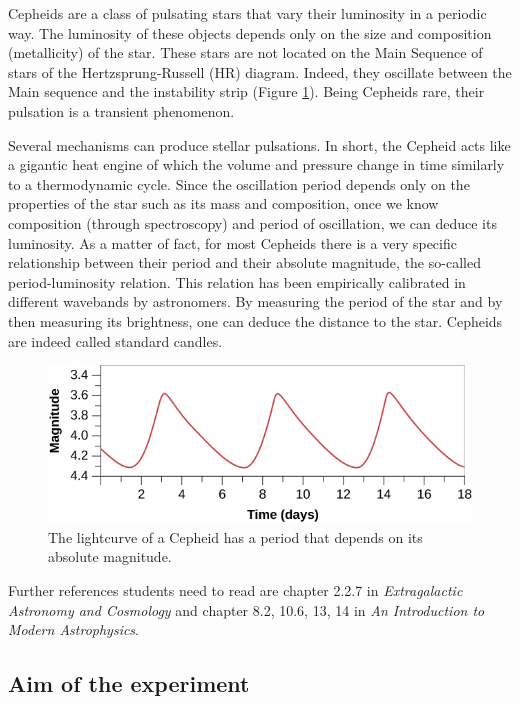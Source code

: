 \documentclass[a4paper, 11pt, fleqn]{memoir}
\begin{document}
Cepheids are a class of pulsating stars that vary their luminosity in a periodic way.
The luminosity of these objects depends only on the size and composition (metallicity) of the star.
These stars are not located on the Main Sequence of stars of the Hertzsprung-Russell (HR) diagram.
Indeed, they oscillate between the Main sequence and the instability strip (Figure \cref{fig:cepheid-lightcurve}).
Being Cepheids rare, their pulsation is a transient phenomenon.

Several mechanisms can produce stellar pulsations.
In short, the Cepheid acts like a gigantic heat engine of which the volume and pressure change in time similarly to a thermodynamic cycle.
Since the oscillation period depends only on the properties of the star such as its mass and composition, once we know composition (through spectroscopy) and period of oscillation, we can deduce its luminosity.
As a matter of fact, for most Cepheids there is a very specific relationship between their period and their absolute magnitude, the so-called period-luminosity relation.
This relation has been empirically calibrated in different wavebands by astronomers.
By measuring the period of the star and by then measuring its brightness, one can deduce the distance to the star.
Cepheids are indeed called standard candles.

\begin{figure}
    \centering
    \includegraphics[width=0.7 \textwidth]{cepheid-light-curve}
    \caption{The lightcurve of a Cepheid has a period that depends on its absolute magnitude. %
    }
    \label{fig:cepheid-lightcurve}
\end{figure}

Further references students need to read are chapter 2.2.7 in \emph{Extragalactic Astronomy and Cosmology}\autocite{Schneider2006ExtragalacticAstronomy} and chapter 8.2, 10.6, 13, 14 in \emph{An Introduction to Modern Astrophysics}\autocite{carroll2017introduction}.

\subsection{Aim of the experiment}
\end{document}
